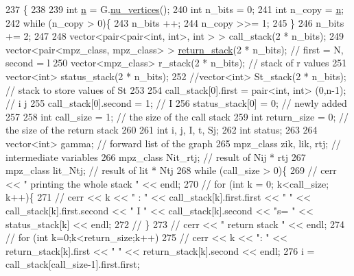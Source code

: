 \begin{DoxyCode}
237 \{
238 
239   \textcolor{keywordtype}{int} \hyperlink{classgraph__encoder_a7fedc9ace19e34abb32f1851c8597591}{n} = G.\hyperlink{classgraph_a70a6e0e4e0a874ab122405abd38f83cd}{nu\_vertices}();
240   \textcolor{keywordtype}{int} n\_bits = 0;
241   \textcolor{keywordtype}{int} n\_copy = \hyperlink{classgraph__encoder_a7fedc9ace19e34abb32f1851c8597591}{n};
242   \textcolor{keywordflow}{while} (n\_copy > 0)\{
243     n\_bits ++;
244     n\_copy >>= 1;
245   \}
246   n\_bits += 2;
247 
248   vector<pair<pair<int, int>, \textcolor{keywordtype}{int} > > call\_stack(2 * n\_bits);
249   vector<pair<mpz\_class, mpz\_class> > \hyperlink{namespacehelper__vars_a6d2100c373830cacd232319a9958652d}{return\_stack}(2 * n\_bits); \textcolor{comment}{// first = N, second = l}
250   vector<mpz\_class> r\_stack(2 * n\_bits); \textcolor{comment}{// stack of r values }
251   vector<int> status\_stack(2 * n\_bits);
252   \textcolor{comment}{//vector<int> St\_stack(2 * n\_bits); // stack to store values of St}
253 
254   call\_stack[0].first = pair<int, int> (0,n-1); \textcolor{comment}{// i j }
255   call\_stack[0].second = 1; \textcolor{comment}{// I}
256   status\_stack[0] = 0; \textcolor{comment}{// newly added}
257 
258   \textcolor{keywordtype}{int} call\_size = 1; \textcolor{comment}{// the size of the call stack}
259   \textcolor{keywordtype}{int} return\_size = 0; \textcolor{comment}{// the size of the return stack}
260 
261   \textcolor{keywordtype}{int} i, j, I, t, Sj;
262   \textcolor{keywordtype}{int} status;
263 
264   vector<int> gamma; \textcolor{comment}{// forward list  of the graph}
265   mpz\_class zik, lik, rtj; \textcolor{comment}{// intermediate variables}
266   mpz\_class Nit\_rtj; \textcolor{comment}{// result of Nij * rtj}
267   mpz\_class lit\_Ntj; \textcolor{comment}{// result of lit * Ntj }
268   \textcolor{keywordflow}{while} (call\_size > 0)\{
269     \textcolor{comment}{// cerr << " printing the whole stack " << endl;}
270     \textcolor{comment}{// for (int k = 0; k<call\_size; k++)\{}
271     \textcolor{comment}{//   cerr << k << " : " << call\_stack[k].first.first << " " << call\_stack[k].first.second << " I " <<
       call\_stack[k].second << "s= " << status\_stack[k] << endl;}
272     \textcolor{comment}{// \}}
273     \textcolor{comment}{// cerr << " return stack " << endl;}
274     \textcolor{comment}{// for (int k=0;k<return\_size;k++)}
275     \textcolor{comment}{//   cerr << k << ": " << return\_stack[k].first << " " << return\_stack[k].second << endl;}
276     i = call\_stack[call\_size-1].first.first;

\end{DoxyCode}
